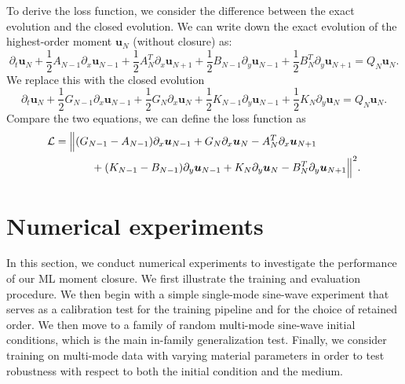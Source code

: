 \documentclass[11pt]{article}
\numberwithin{equation}{section}
\newcommand{\vect}[1]{\boldsymbol{#1}}
\newcommand{\half}{\frac{1}{2}}
\begin{document}
To derive the loss function, we consider the difference between the exact evolution and the closed evolution. We can write down the exact evolution of the highest-order moment $\vect{u}_N$ (without closure) as:
\begin{equation}
\partial_t \vect{u}_N 
+ \half A_{N-1} \partial_x \vect{u}_{N-1} 
+ \half A_{N}^T \partial_x \vect{u}_{N+1}
+ \half B_{N-1} \partial_y \vect{u}_{N-1} 
+ \half B_{N}^T \partial_y \vect{u}_{N+1} = Q_N \vect{u}_N.
\end{equation} 
We replace this with the closed evolution
\begin{equation}
\partial_t \vect{u}_N 
+ \half G_{N-1} \partial_x \vect{u}_{N-1}
+ \half G_{N} \partial_x \vect{u}_{N}
+ \half K_{N-1} \partial_y \vect{u}_{N-1} 
+ \half K_{N} \partial_y \vect{u}_{N} = Q_N \vect{u}_N.
\end{equation}
Compare the two equations, we can define the loss function as
\begin{equation}\label{eq:loss-function}
\begin{aligned}
\mathcal{L}
= {}&
\Bigl\|
(G_{N-1}-A_{N-1}) \partial_x \vect{u}_{N-1}
+ G_{N} \partial_x \vect{u}_{N}
- A_{N}^T \partial_x \vect{u}_{N+1}
\\
&\qquad
+ (K_{N-1}-B_{N-1}) \partial_y \vect{u}_{N-1}
+ K_{N} \partial_y \vect{u}_{N}
- B_{N}^T \partial_y \vect{u}_{N+1}
\Bigr\|^2.
\end{aligned}
\end{equation}



























\section{Numerical experiments}\label{sec:numerical-experiments}

In this section, we conduct numerical experiments to investigate the performance of our ML moment closure. 
We first illustrate the training and evaluation procedure. We then begin with a simple single-mode sine-wave experiment that serves as a calibration test for the training pipeline and for the choice of retained order. We then move to a family of random multi-mode sine-wave initial conditions, which is the main in-family generalization test. Finally, we consider training on multi-mode data with varying material parameters in order to test robustness with respect to both the initial condition and the medium. 
\end{document}
